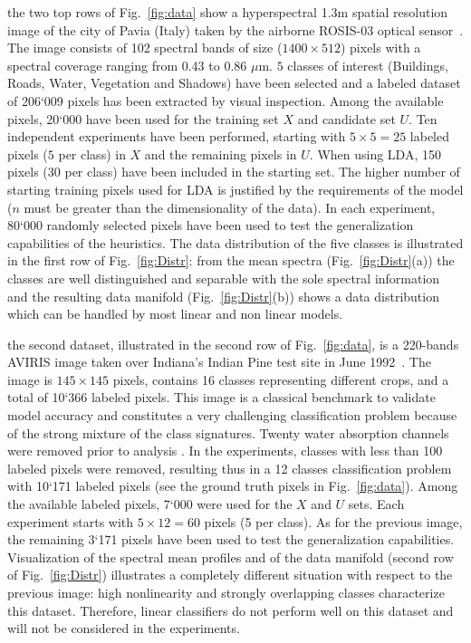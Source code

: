 the two top rows of Fig.~\ref{fig:data} show a hyperspectral 1.3m spatial resolution image of the city of Pavia (Italy) taken by the airborne ROSIS-03 optical sensor~. The image consists of 102 spectral bands of size ($1400 \times 512$) pixels with a spectral coverage ranging from 0.43 to 0.86 $\mu$m. $5$ classes of interest (Buildings, Roads, Water, Vegetation and Shadows) have been selected and a labeled dataset of 206`009 pixels has been extracted by visual inspection. Among the available pixels, 20`000 have been used for the training set $X$ and candidate set $U$. Ten independent experiments have been performed, starting with $5 \times 5 = 25$ labeled pixels ($5$ per class) in $X$ and the remaining pixels in $U$. When using LDA,  150 pixels ($30$  per class) have been included in the starting set. The higher number of starting training pixels used for LDA is justified by the requirements of the model ($n$ must be greater than the dimensionality of the data). In each experiment, 80`000 randomly selected pixels have been used to test the generalization capabilities of the heuristics.
The data distribution of the five classes is illustrated in the first row of Fig.~\ref{fig:Distr}: from the mean spectra (Fig.~\ref{fig:Distr}(a)) the classes are well distinguished and separable with the sole spectral information and the resulting data manifold (Fig.~\ref{fig:Distr}(b)) shows a data distribution which can be handled by most linear and non linear models.

the second dataset, illustrated in the second row of Fig.~\ref{fig:data}, is a 220-bands AVIRIS image taken over Indiana's Indian Pine test site in June 1992~. The image is $145 \times 145$ pixels, contains 16  classes representing different crops, and a total of 10`366 labeled pixels. This image is a classical benchmark to validate model accuracy and constitutes a very challenging classification problem because of the strong mixture of the class signatures. Twenty water absorption channels were removed prior to analysis
. In the experiments, classes with less than 100 labeled pixels were removed, resulting thus in a 12 classes classification problem with 10`171 labeled pixels (see the ground truth pixels in Fig.~\ref{fig:data}). Among the available labeled pixels, 7`000 were used for the $X$ and $U$ sets. Each experiment starts with $5 \times 12 =60$ pixels (5 per class). As for the previous image, the remaining 3`171 pixels have been used to test the generalization capabilities.
Visualization of the spectral mean profiles and of the data manifold (second row of Fig.~\ref{fig:Distr}) illustrates a completely different situation with respect to the previous image: high nonlinearity and strongly overlapping classes characterize this dataset. Therefore, linear classifiers do not perform well on this dataset and will not be considered in the experiments.


